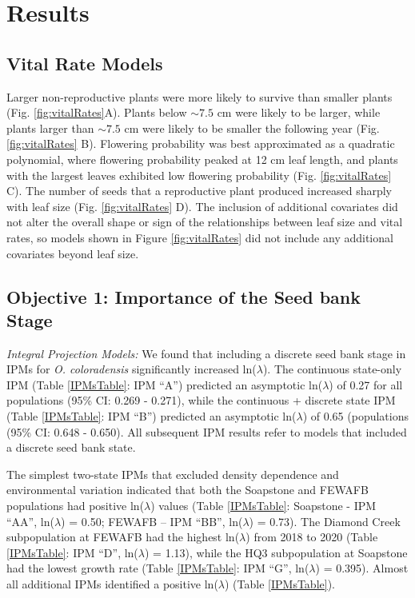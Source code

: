 \documentclass[12pt, letterpaper]{article}
\begin{document}
\section{Results}

\subsection{Vital Rate Models} 

Larger non-reproductive plants were more likely to survive than smaller plants (Fig. \ref{fig:vitalRates}A). Plants below $\sim7.5$ cm were likely to be larger, while plants larger than $\sim7.5$ cm were likely to be smaller the following year (Fig. \ref{fig:vitalRates} B). Flowering probability was best approximated as a quadratic polynomial, where flowering probability peaked at 12 cm leaf length, and plants with the largest leaves exhibited low flowering probability (Fig. \ref{fig:vitalRates} C). The number of seeds that a reproductive plant produced increased sharply with leaf size (Fig. \ref{fig:vitalRates} D). The inclusion of additional covariates did not alter the overall shape or sign of the relationships between leaf size and vital rates, so models shown in Figure \ref{fig:vitalRates} did not include any additional covariates beyond leaf size.  

\subsection{Objective 1: Importance of the Seed bank Stage}

\textit{Integral Projection Models:} We found that including a discrete seed bank stage in IPMs for \textit{O. coloradensis} significantly increased ln($\lambda$). The continuous state-only IPM (Table \ref{IPMsTable}: IPM “A”) predicted an asymptotic ln($\lambda$) of 0.27 for all populations (95\% CI: 0.269 - 0.271), while the continuous + discrete state IPM (Table \ref{IPMsTable}: IPM “B”) predicted an asymptotic ln($\lambda$) of 0.65 (populations (95\% CI: 0.648 - 0.650). All subsequent IPM results refer to models that included a discrete seed bank state. 

The simplest two-state IPMs that excluded density dependence and environmental variation indicated that both the Soapstone and FEWAFB populations had positive ln($\lambda$) values (Table \ref{IPMsTable}: Soapstone - IPM “AA”, ln($\lambda$) = 0.50;  FEWAFB – IPM “BB”, ln($\lambda$) =  0.73). The Diamond Creek subpopulation at FEWAFB had the highest ln($\lambda$) from 2018 to 2020 (Table \ref{IPMsTable}: IPM “D”, ln($\lambda$) = 1.13), while the HQ3 subpopulation at Soapstone had the lowest growth rate (Table \ref{IPMsTable}: IPM “G”, ln($\lambda$) = 0.395). Almost all additional IPMs identified a positive ln($\lambda$) (Table \ref{IPMsTable}).   
\end{document}
